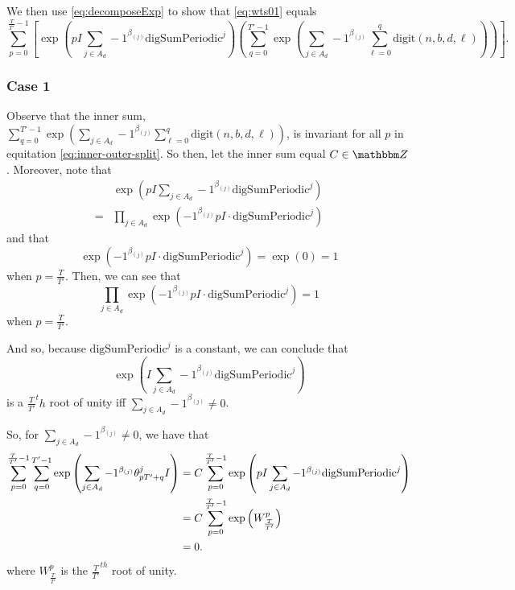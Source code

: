 \documentclass[11pt,titlepage]{article}
\newcommand{\rationalPeriodTotal}{{T}'}
\newcommand{\totalPeriod}{T}
\newcommand{\digSumPeriodic}{\mathrm{digSumPeriodic}^j}
\newcommand{\totalOverRationalFrac}{\frac{\totalPeriod}{\rationalPeriodTotal}}
\begin{document}
We then use \eqref{eq:decomposeExp} to show that \eqref{eq:wts01} equals
\begin{equation}
\label{eq:inner-outer-split}
  \sum_{p= 0}^{\frac{\totalPeriod}{\rationalPeriodTotal} - 1} \left[
    \exp\left(
      pI \sum_{j \in A_d} -1 ^ {\beta_{(j)}}
      \digSumPeriodic
    \right)
  \left(
  \sum_{q = 0}^{\rationalPeriodTotal - 1}
    \exp\left(
        \sum_{j \in A_d} -1 ^ {\beta_{(j)}}
          \sum_{\ell = 0}^{q}\mathrm{digit}(n, b, d, \ell)
    \right)\right)\right].
\end{equation}

\subsubsection*{Case 1}
Observe that the inner sum,
$
  \sum_{q = 0}^{\rationalPeriodTotal - 1}
  \exp\left(
      \sum_{j \in A_d} -1 ^ {\beta_{(j)}}
        \sum_{\ell = 0}^{q}\mathrm{digit}(n, b, d, \ell)
  \right)
$,
is invariant for all $p$ in equitation \eqref{eq:inner-outer-split}. So then,
let the inner sum equal $C \in \Z$.  Moreover, note that 
\begin{align*}
  &\exp\left(
      pI \sum_{j \in A_d} -1 ^ {\beta_{(j)}}
      \digSumPeriodic
    \right)\\
  =& \prod_{j \in A_d} \exp\left(-1^{\beta_{(j)}} pI \cdot \digSumPeriodic \right)
\end{align*}
and that 
\begin{equation*}
  \exp\left(-1^{\beta_{(j)}} pI \cdot \digSumPeriodic \right) = \exp\left(0\right) = 1
\end{equation*}
when $p = \frac{\totalPeriod}{\rationalPeriodTotal}$. Then, we can see that
$$
\prod_{j \in A_d} \exp\left(-1^{\beta_{(j)}} pI \cdot \digSumPeriodic \right) = 1
$$
when $p = \frac{\totalPeriod}{\rationalPeriodTotal}$.

And so, because $\digSumPeriodic$ is a constant, we can conclude that
\begin{equation*}
 \exp\left(
      I \sum_{j \in A_d} -1 ^ {\beta_{(j)}}
      \digSumPeriodic
    \right) 
\end{equation*}
is a $\totalOverRationalFrac^th$ root of unity iff $\sum_{j \in A_d} -1 ^ {\beta_{(j)}} \neq 0$.

So, for $\sum_{j \in A_d} -1 ^ {\beta_{(j)}} \neq 0$, we have that
\begin{align*}
  \eqWTSInnerProd &= C \sum_{p= 0}^{\frac{\totalPeriod}{\rationalPeriodTotal} - 1}
    \exp\left(
      pI \sum_{j \in A_d} -1 ^ {\beta_{(j)}}
      \digSumPeriodic
    \right) \\
    &= C \sum_{p = 0}^{\totalOverRationalFrac - 1}\exp\left(W_{\totalOverRationalFrac}^p\right) \\
    &= 0.
\end{align*}
where $W_{\totalOverRationalFrac}^p$ is the $\totalOverRationalFrac^{th}$ root of unity.
\end{document}
